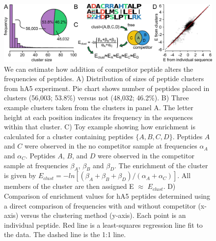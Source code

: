 \begin{figure}%
\centering
	\includegraphics{ch6-figS4.png} 
\caption[We can estimate how addition of competitor 
alters frequencies]{We can estimate how addition of competitor peptide
alters the frequencies of peptides. A) Distribution of sizes of peptide
clusters from hA5 experiment. Pie chart shows number of peptides placed
in clusters (56,003; 53.8\%) versus not (48,032; 46.2\%). B) Three
example clusters taken from the clusters in panel A. The letter height
at each position indicates its frequency in the sequences within that
cluster. C) Toy example showing how enrichment is calculated for a
cluster containing peptides $\{A,B,C,D\}$. Peptides $A$ and $C$
were observed in the no competitor sample at frequencies $\alpha_{A}$
and $\alpha_{C}$. Peptides $A$, $B$, and $D$ were observed in
the competitor sample at frequencies $\beta_{A}$, $\beta_{B}$ and
$\beta_{D}$. The enrichment of the cluster is given by $E_{clust}=-ln[(\beta_{A}+\beta_{B}+\beta_{D})/(\alpha_{A}+\alpha_{C})]$.
All members of the cluster are then assigned E $\approx$ $E_{clust}$.
D) Comparison of enrichment values for hA5 peptides determined using
a direct comparison of frequencies with and without competitor (x-axis)
versus the clustering method (y-axis). Each point is an individual
peptide. Red line is a least-squares regression line fit to the data.
The dashed line is the 1:1 line.\label{samplefigure}}	
\end{figure}

